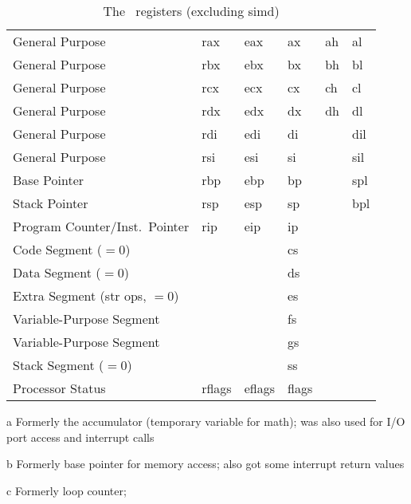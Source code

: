 \begin{table*}
  \centering
  \renewcommand\theadfont{\normalcolor\normalsize\normalfont}
  \begin{threeparttable}
    \caption{The \arch\ registers (excluding \ac{simd})}\label{tbl:regs}
    \begin{tabular}{lAAAAA}
      \toprule
       &  &  &
       &  &  \\
      \midrule
      General Purpose & rax & eax & ax & ah & al \\
      General Purpose & rbx & ebx & bx & bh & bl \\
      General Purpose & rcx & ecx & cx & ch & cl \\
      General Purpose & rdx & edx & dx & dh & dl \\
      General Purpose & rdi & edi & di && dil \\
      General Purpose & rsi & esi & si && sil \\
      Base Pointer & rbp & ebp & bp && spl \\
      Stack Pointer & rsp & esp & sp && bpl \\
      Program Counter/Inst.\ Pointer & rip & eip & ip && \\
      Code Segment ($=0$) &&& cs && \\
      Data Segment ($=0$) &&& ds && \\
      Extra Segment (str ops, $=0$) &&& es && \\
      Variable-Purpose Segment &&& fs && \\
      Variable-Purpose Segment &&& gs && \\
      Stack Segment ($=0$) &&& ss && \\
      Processor Status & rflags & eflags & flags && \\
      \bottomrule
    \end{tabular}
    \begin{tablenotes}
      \item[a] Formerly the accumulator (temporary variable for math);%
        was also used for I/O port access and interrupt calls
      \item[b] Formerly base pointer for memory access;%
        also got some interrupt return values
      \item[c] Formerly loop counter;%

\end{tablenotes}
\end{threeparttable}
\end{table*}

